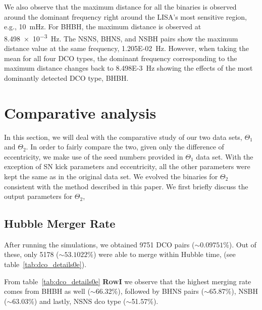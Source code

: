 \documentclass[journal, twocolumns]{IEEEtran}
\newcommand{\scientific}[2]{\SI[scientific-notation=engineering, exponent-to-prefix]{#1}{#2}}
\begin{document}
	We also observe that the maximum distance for all the binaries is observed around the dominant frequency right around the LISA's most sensitive region, e.g., \scientific{10}{\milli\hertz}.
	For BHBH, the maximum distance is observed at \scientific{8.498e-3}{\hertz}.
	The NSNS, BHNS, and NSBH pairs show the maximum distance value at the same frequency, \scientific{1.205E-02}{\hertz}.
	However, when taking the mean for all four DCO types, the dominant frequency corresponding to the maximum distance changes back to \scientific{8.498E-3}{\hertz} showing the effects of the most dominantly detected DCO type, BHBH.

    \section{Comparative analysis}
    \label{sec:comparative-analysis}
    In this section, we will deal with the comparative study of our two data sets, $\Theta_1$ and $\Theta_2$.
    In order to fairly compare the two, given only the difference of eccentricity, we make use of the seed numbers provided in $\Theta_1$ data set.
    With the exception of SN kick parameters and eccentricity, all the other parameters were kept the same as in the original data set.
    We evolved the binaries for $\Theta_2$ consistent with the method described in this paper.
    We first briefly discuss the output parameters for $\Theta_2$,
    
    \subsection{Hubble Merger Rate} 
    After running the simulations, we obtained 9751 DCO pairs ($\sim0.09751\%$). Out of these, only 5178 ($\sim53.1022\%$) were able to merge within Hubble time, (see table~\ref{tab:dco_details0e}).

	From table~\ref{tab:dco_details0e} \textsc{\textbf{RowI}} we observe that the highest merging rate comes from BHBH as well ($\sim$66.32\%), followed by BHNS pairs ($\sim$65.87\%), NSBH ($\sim$63.03\%) and lastly, NSNS dco type ($\sim$51.57\%).
	
\end{document}
